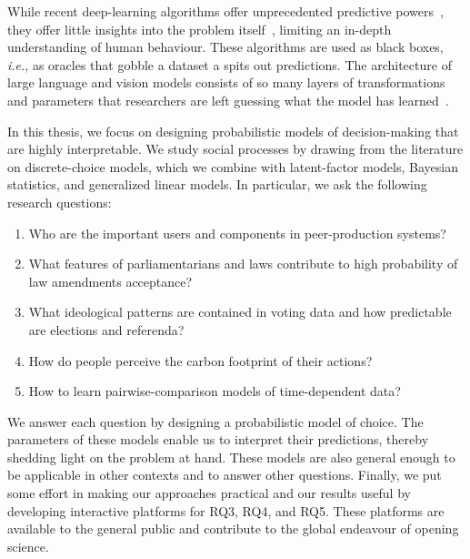 While recent deep-learning algorithms offer unprecedented predictive powers~\citep{lecun2015deep}, they offer little insights into the problem itself~\citep{rudin2019stop}, limiting an in-depth understanding of human behaviour.
These algorithms are used as black boxes, \textit{i.e.}, as oracles that gobble a dataset a spits out predictions.
The architecture of large language and vision models consists of so many layers of transformations and parameters that researchers are left guessing what the model has learned~\citep{fong2017interpretable,guidotti2018survey,olah2020zoom,hilton2020understanding}.

In this thesis, we focus on designing probabilistic models of decision-making that are highly interpretable.
We study social processes by drawing from the literature on discrete-choice models, which we combine with latent-factor models, Bayesian statistics, and generalized linear models.
In particular, we ask the following research questions:
\begin{enumerate}[
		leftmargin=1.5cm,
		topsep=0cm,
		parsep=0.0pt,
		itemsep=1.5pt,
		label=\textbf{RQ\arabic*}
	]
	\item Who are the important users and components in peer-production systems?
	\item What features of parliamentarians and laws contribute to high probability of law amendments acceptance?
	\item What ideological patterns are contained in voting data and how predictable are elections and referenda?
	\item How do people perceive the carbon footprint of their actions?
	\item How to learn pairwise-comparison models of time-dependent data?
\end{enumerate}
We answer each question by designing a probabilistic model of choice.
The parameters of these models enable us to interpret their predictions, thereby shedding light on the problem at hand.
These models are also general enough to be applicable in other contexts and to answer other questions.
Finally, we put some effort in making our approaches practical and our results useful by developing interactive platforms for RQ3, RQ4, and RQ5.
These platforms are available to the general public and contribute to the global endeavour of opening science.
